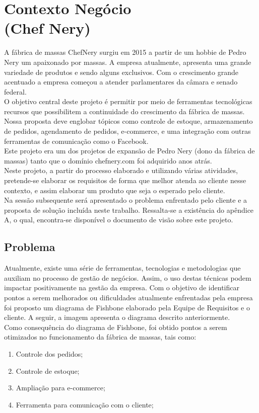 
\chapter[Contexto do Negócio]{Contexto Negócio \\ (Chef Nery)}
A  fábrica de massas ChefNery surgiu em 2015 a partir de um hobbie de Pedro Nery um apaixonado por massas.  A empresa atualmente, apresenta uma grande variedade de produtos e sendo alguns exclusivos. Com o crescimento grande acentuado a empresa começou a atender parlamentares da câmara e senado federal.\\
\tab O objetivo central deste projeto é permitir por meio de ferramentas tecnológicas recursos que possibilitem a continuidade do crescimento da fábrica de massas. Nossa proposta deve englobar tópicos como controle de estoque, armazenamento de pedidos, agendamento de pedidos, e-commerce, e uma integração com outras ferramentas de comunicação como o Facebook.\\
\tab Este projeto era um dos projetos de expansão de Pedro Nery (dono da fábrica de massas) tanto que o domínio chefnery.com foi adquirido anos atrás.\\
\tab Neste projeto, a partir do processo elaborado e utilizando várias atividades, pretende-se elaborar os requisitos de forma que melhor atenda ao cliente nesse contexto, e assim elaborar um produto que seja o esperado pelo cliente. \\
\tab Na sessão subsequente será apresentado o problema enfrentado pelo cliente e a proposta de solução incluída neste trabalho. Ressalta-se a existência do apêndice A, o qual, encontra-se disponível o documento de visão sobre este projeto. \\


{\large {\section { Problema \\ } } }

Atualmente, existe uma série de ferramentas, tecnologias e metodologias que auxiliam no processo de gestão de negócios.  Assim, o uso destas técnicas podem impactar positivamente na gestão da empresa. Com o objetivo de identificar  pontos a serem melhorados ou dificuldades atualmente enfrentadas pela empresa foi proposto um diagrama de Fishbone elaborado pela Equipe de Requisitos e o cliente. A seguir, a imagem apresenta o diagrama descrito anteriormente.\\
\tab Como consequência do diagrama de Fishbone, foi obtido pontos a serem otimizados no funcionamento da fábrica de massas, tais como:
\begin{enumerate}
	\item Controle dos pedidos;
	\item Controle de estoque;
	\item Ampliação para e-commerce;
	\item Ferramenta para comunicação com o cliente;
\end{enumerate}


